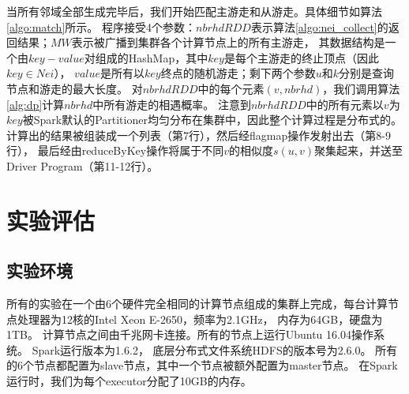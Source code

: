 \documentclass[master]{njuthesis}
\begin{document}
当所有邻域全部生成完毕后，我们开始匹配主游走和从游走。具体细节如算法\ref{algo:match}所示。
程序接受4个参数：$nbrhdRDD$表示算法\ref{algo:nei_collect}的返回结果；$MW$表示被广播到集群各个计算节点上的所有主游走，
其数据结构是一个由$key-value$对组成的HashMap，其中$key$是每个主游走的终止顶点（因此$key \in Nei$），
$value$是所有以$key$终点的随机游走；剩下两个参数$u$和$k$分别是查询节点和游走的最大长度。
对$nbrhdRDD$中的每个元素$(v,nbrhd)$，我们调用算法\ref{alg:dp}计算$nbrhd$中所有游走的相遇概率。
注意到$nbrhdRDD$中的所有元素以$v$为$key$被Spark默认的Partitioner均匀分布在集群中，因此整个计算过程是分布式的。
计算出的结果被组装成一个列表（第7行），然后经flagmap操作发射出去（第8-9行），
最后经由reduceByKey操作将属于不同$v$的相似度$s(u,v)$聚集起来，并送至Driver Program（第11-12行）。

	

\section{实验评估}
\subsection{实验环境}
所有的实验在一个由6个硬件完全相同的计算节点组成的集群上完成，每台计算节点处理器为12核的Intel Xeon E-2650，频率为2.1GHz，
内存为64GB，硬盘为1TB。 计算节点之间由千兆网卡连接。所有的节点上运行Ubuntu 16.04操作系统。 
Spark运行版本为1.6.2， 底层分布式文件系统HDFS的版本号为2.6.0。
所有的6个节点都配置为slave节点，其中一个节点被额外配置为master节点。 
在Spark运行时，我们为每个executor分配了10GB的内存。
\end{document}

